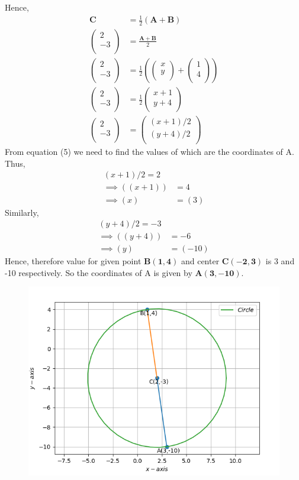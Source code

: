 \documentclass[12pt]{article}
\providecommand{\brak}[1]{\ensuremath{\left(#1\right)}}
\newcommand{\myvec}[1]{\ensuremath{\begin{pmatrix}#1\end{pmatrix}}}
\let\vec\mathbf
\begin{document}
\begin{enumerate}
Hence,	
	\begin{align}
	\vec{C} &= \frac{1}{2}\vec{(A+B)}\\
	\myvec{
	    2\\
	   -3\\
		} &= \frac{\vec{A+B}}{2} \\
		\myvec{
	    2\\
	   -3\\
		} &= \frac{1}{2}\brak{\myvec{x\\y\\}+\myvec{1\\4\\}} \\
		\myvec{
	    2\\
	   -3\\
		} &= \frac{1}{2}\myvec{x+1\\y+4\\}\\
		\myvec{
	    2\\
	   -3\\
		} &= \myvec{(x+1)/2\\(y+4)/2\\}	
	\end{align}       
	 From equation (5) we need to find the values of which are the coordinates of A. Thus,
    \begin{align}	                     
	{(x+1)/2} = 2\\
	\implies  
	\brak{(x+1)}& = 4 \\
	\implies 
	\brak{x}& = (3)
    \end{align}
    Similarly,
    \begin{align}
    {(y+4)/2} = -3\\
    \implies
    \brak{(y+4)}& = -6 \\
    \implies
    \brak {y}& = (-10)
    \end{align}
    Hence, therefore value for given point $\vec{B(1,4)}$ and center $\vec{C(-2,3)}$ is 3 and -10 respectively. So the coordinates of A is given by 
  $\vec{A(3,-10)}$.	
\hspace{5mm}
\begin{figure}[!h]
\begin{center}	
	\includegraphics[width=\columnwidth]{./figs/Vector1.png}

\end{center}
\end{figure}
\end{enumerate}
\end{document}
